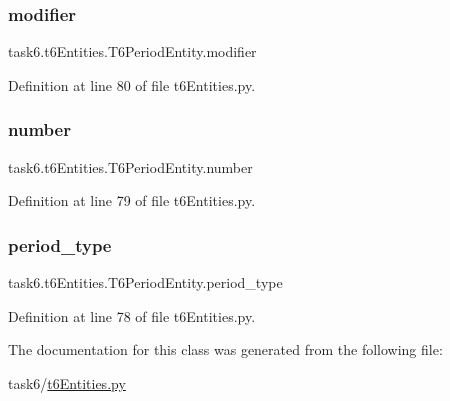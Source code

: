 \subsubsection{\texorpdfstring{modifier}{modifier}}
{\footnotesize\ttfamily task6.\+t6\+Entities.\+T6\+Period\+Entity.\+modifier}



Definition at line 80 of file t6\+Entities.\+py.

\mbox{\label{classtask6_1_1t6Entities_1_1T6PeriodEntity_ae1a98d39cfb27a8dd99f3b54f35b4b14}} 
\subsubsection{\texorpdfstring{number}{number}}
{\footnotesize\ttfamily task6.\+t6\+Entities.\+T6\+Period\+Entity.\+number}



Definition at line 79 of file t6\+Entities.\+py.

\mbox{\label{classtask6_1_1t6Entities_1_1T6PeriodEntity_aa40d8fd07038f68f3f918a09fb0d1beb}} 
\subsubsection{\texorpdfstring{period\+\_\+type}{period\_type}}
{\footnotesize\ttfamily task6.\+t6\+Entities.\+T6\+Period\+Entity.\+period\+\_\+type}



Definition at line 78 of file t6\+Entities.\+py.



The documentation for this class was generated from the following file\+:\begin{DoxyCompactItemize}
\item 
task6/\hyperlink{t6Entities_8py}{t6\+Entities.\+py}\end{DoxyCompactItemize}
